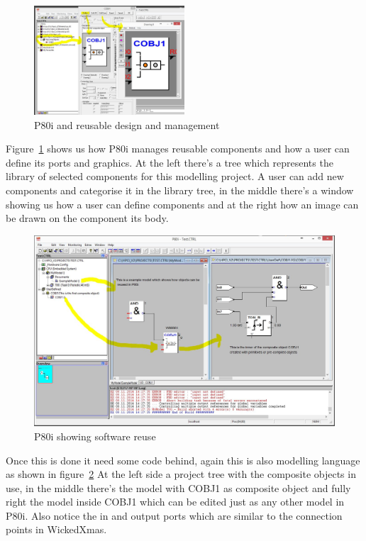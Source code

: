 \documentclass[a4paper,11pt,final]{article}
\begin{document}
\begin{figure}[here]
\center
\includegraphics[width=0.50\textwidth]{p80iObjEditor.JPG}
\caption{P80i and reusable design and management}
\label{fig:p80iObjEditor}
\end{figure}
Figure~\ref{fig:p80iObjEditor} shows us how P80i manages reusable components
and how a user can define its ports and graphics.
At the left there's a tree which represents the library of selected
components for this modelling project.
A user can add new components and categorise it in the library tree, in the middle
there's a window showing us how a user can define components and at the right
how an image can be drawn on the component its body.

\begin{figure}[here]
\includegraphics[width=1.0\textwidth]{p80i.JPG}
\caption{P80i showing software reuse}
\label{fig:p80i}
\end{figure}

Once this is done it need some code behind, again this is also modelling language
as shown in figure~\ref{fig:p80i}
At the left side a project tree with the composite objects in use, in the middle 
there's the model with COBJ1 as composite object and fully right the model
inside COBJ1 which can be edited just as any other model in P80i. Also
notice the in and output ports which are similar to the connection points
in WickedXmas.
\end{document}
